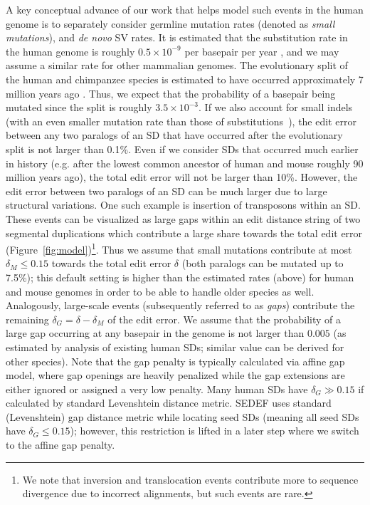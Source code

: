 \documentclass{article}
\begin{document}
A key conceptual advance of our work that helps model such events in the human genome is to separately consider germline mutation rates (denoted as \emph{small mutations}), and \textit{de novo} SV rates. It is estimated that the 
substitution rate in the human genome is roughly $0.5 \times 10^{-9}$ per basepair per year \citep{Scally2016}, and we may assume a similar rate for other mammalian genomes. The evolutionary split of the human and chimpanzee species  
is estimated to have occurred approximately 7 million years ago \citep{Hedges2009}. Thus, we expect that the probability of a basepair being mutated since the split is roughly $3.5 \times 10^{-3}$. If we also account for small indels (with an  even smaller mutation rate than those of substitutions~\citep{Montgomery2013}), the edit error between any two paralogs of an SD that have occurred after the evolutionary split is not larger than 0.1\%. Even if we consider SDs that occurred much earlier in history (e.g. after the lowest common ancestor of human and mouse roughly 90 million years ago), the total edit error will not be larger than 10\%. 
However, the edit error between two paralogs of an SD can be much larger due to large structural variations. One such example is insertion of transposons within an SD. These events can be visualized as large gaps within an edit distance string of two segmental duplications which contribute a large share towards the total edit error (Figure~\ref{fig:model})\footnote{We note that inversion and translocation events contribute more to sequence divergence due to incorrect alignments, but such events are rare.}. 
Thus we assume that small mutations contribute at most $\delta_M \leq 0.15$ towards the total edit error $\delta$ (both paralogs can be mutated up to 7.5\%); this default setting is higher than the estimated rates (above) for human and mouse genomes in order to be able to handle older species as well. Analogously, large-scale events (subsequently referred to as \emph{gaps}) contribute the remaining $\delta_G = \delta - \delta_M$ of the edit error. We assume that the probability of a large gap occurring at any basepair in the genome is not larger than $0.005$ (as estimated by analysis of existing human SDs; similar value can be derived for other species). 
Note that the gap penalty is typically calculated via affine gap model, where gap openings are heavily penalized while the gap extensions are either ignored or assigned a very low penalty. Many human SDs have $\delta_G \gg 0.15$ if calculated by standard Levenshtein distance metric. SEDEF uses standard (Levenshtein) gap distance metric while locating seed SDs (meaning all seed SDs have $\delta_G\leq 0.15$); however, this restriction is lifted in a later step where we switch to the affine gap penalty.
\end{document}
